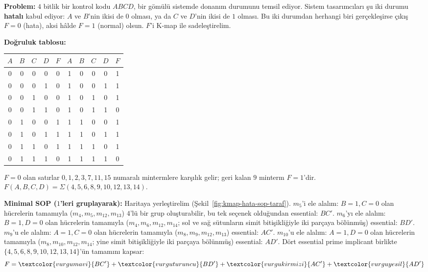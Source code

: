 \begin{ornek}\label{orn:pos-hata-kontrol}
\textbf{Problem:} $4$ bitlik bir kontrol kodu $ABCD$, bir gömülü sistemde donanım
durumunu temsil ediyor. Sistem tasarımcıları şu iki durumu \textbf{hatalı} kabul
ediyor: $A$ ve $B$'nin ikisi de $0$ olması, ya da $C$ ve $D$'nin ikisi de $1$ olması.
Bu iki durumdan herhangi biri gerçekleşirse çıkış $F=0$ (hata), aksi hâlde $F=1$
(normal) olsun. $F$'i K-map ile sadeleştirelim.

\textbf{Doğruluk tablosu:}
\begin{center}
\begin{tabular}{cccc|c||cccc|c}
\toprule
$A$&$B$&$C$&$D$&$F$ & $A$&$B$&$C$&$D$&$F$\\
\midrule
0&0&0&0&0 & 1&0&0&0&1\\
0&0&0&1&0 & 1&0&0&1&1\\
0&0&1&0&0 & 1&0&1&0&1\\
0&0&1&1&0 & 1&0&1&1&0\\
0&1&0&0&1 & 1&1&0&0&1\\
0&1&0&1&1 & 1&1&0&1&1\\
0&1&1&0&1 & 1&1&1&0&1\\
0&1&1&1&0 & 1&1&1&1&0\\
\bottomrule
\end{tabular}
\end{center}
$F=0$ olan satırlar $0,1,2,3,7,11,15$ numaralı mintermlere karşılık gelir; geri kalan
$9$ minterm $F=1$'dir. $F(A,B,C,D)=\Sigma(4,5,6,8,9,10,12,13,14)$.

\textbf{Minimal SOP ($1$'leri gruplayarak):} Haritaya yerleştirelim
(Şekil~\ref{fig:kmap-hata-sop-taraf}). $m_5$'i ele alalım: $B=1,C=0$ olan hücrelerin
tamamıyla ($m_4,m_5,m_{12},m_{13}$) $4$'lü bir grup oluşturabilir, bu tek seçenek
olduğundan essential: $BC'$. $m_6$'yı ele alalım: $B=1,D=0$ olan hücrelerin tamamıyla
($m_4,m_6,m_{12},m_{14}$; sol ve sağ sütunların simit bitişikliğiyle iki parçaya
bölünmüş) essential: $BD'$. $m_9$'u ele alalım: $A=1,C=0$ olan hücrelerin tamamıyla
($m_8,m_9,m_{12},m_{13}$) essential: $AC'$. $m_{10}$'u ele alalım: $A=1,D=0$ olan
hücrelerin tamamıyla ($m_8,m_{10},m_{12},m_{14}$; yine simit bitişikliğiyle iki
parçaya bölünmüş) essential: $AD'$. Dört essential prime implicant birlikte
$\{4,5,6,8,9,10,12,13,14\}$'ün tamamını kapsar:
\[
F = \textcolor{vurgumavi}{BC'} + \textcolor{vurguturuncu}{BD'} + \textcolor{vurgukirmizi}{AC'} + \textcolor{vurguyesil}{AD'}
\]


\end{ornek}
